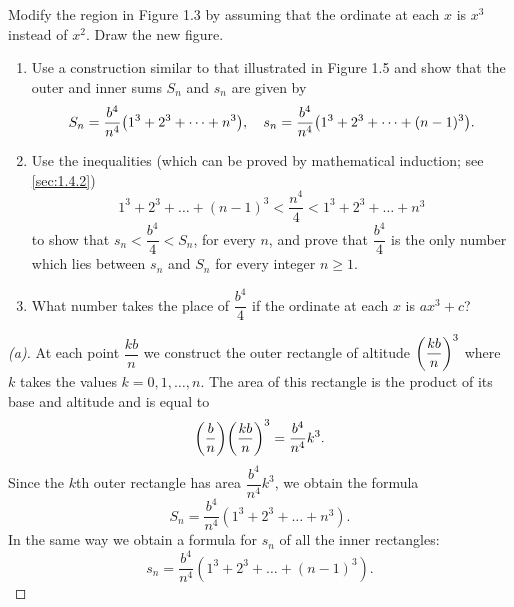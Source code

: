 \begin{ex}\label{1.1.4.2}
  Modify the region in Figure 1.3 by assuming that the ordinate at each \(x\) is \(x^3\) instead of \(x^2\).
  Draw the new figure.
  \begin{enumerate}
    \item Use a construction similar to that illustrated in Figure 1.5 and show that the outer and inner sums \(S_n\) and \(s_n\) are given by
          \[
            S_n = \dfrac{b^4}{n^4} \pa{1^3 + 2^3 + \dots + n^3}, \quad s_n = \dfrac{b^4}{n^4} \pa{1^3 + 2^3 + \dots + (n - 1)^3}.
          \]
    \item Use the inequalities
          (which can be proved by mathematical induction;
          see \cref{sec:1.4.2})
          \begin{equation}\label{eq:1.1.12}
            1^3 + 2^3 + \dots + (n - 1)^3 < \dfrac{n^4}{4} < 1^3 + 2^3 + \dots + n^3
          \end{equation}
          to show that \(s_n < \dfrac{b^4}{4} < S_n\), for every \(n\), and prove that \(\dfrac{b^4}{4}\) is the only number which lies between \(s_n\) and \(S_n\) for every integer \(n \geq 1\).
    \item What number takes the place of \(\dfrac{b^4}{4}\) if the ordinate at each \(x\) is \(ax^3 + c\)?
  \end{enumerate}
\end{ex}

\begin{proof}[(a)]
  At each point \(\dfrac{kb}{n}\) we construct the outer rectangle of altitude \(\left\lparen\dfrac{kb}{n}\right\rparen^3\) where \(k\) takes the values \(k = 0, 1, \dots, n\).
  The area of this rectangle is the product of its base and altitude and is equal to
  \[
    \pa{\dfrac{b}{n}} \pa{\dfrac{kb}{n}}^3 = \dfrac{b^4}{n^4} k^3.
  \]
  Since the \(k\)th outer rectangle has area \(\dfrac{b^4}{n^4} k^3\), we obtain the formula
  \[
    S_n = \dfrac{b^4}{n^4} (1^3 + 2^3 + \dots + n^3).
  \]
  In the same way we obtain a formula for \(s_n\) of all the inner rectangles:
  \[
    s_n = \dfrac{b^4}{n^4} (1^3 + 2^3 + \dots + (n - 1)^3).
  \]
\end{proof}

